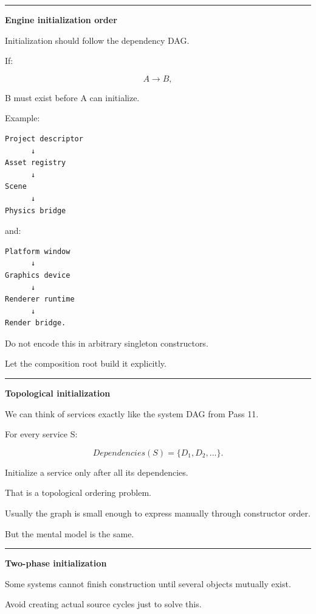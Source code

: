 \begin{center}\rule{0.5\linewidth}{0.5pt}\end{center}

\textbf{Engine initialization order}

Initialization should follow the dependency DAG.

If:

\[
A\rightarrow B,
\]

B must exist before A can initialize.

Example:

\begin{verbatim}
Project descriptor
      ↓
Asset registry
      ↓
Scene
      ↓
Physics bridge
\end{verbatim}

and:

\begin{verbatim}
Platform window
      ↓
Graphics device
      ↓
Renderer runtime
      ↓
Render bridge.
\end{verbatim}

Do not encode this in arbitrary singleton constructors.

Let the composition root build it explicitly.

\begin{center}\rule{0.5\linewidth}{0.5pt}\end{center}

\textbf{Topological initialization}

We can think of services exactly like the system DAG from Pass 11.

For every service S:

\[
Dependencies(S)=\{D_1,D_2,\dots\}.
\]

Initialize a service only after all its dependencies.

That is a topological ordering problem.

Usually the graph is small enough to express manually through constructor order.

But the mental model is the same.

\begin{center}\rule{0.5\linewidth}{0.5pt}\end{center}

\textbf{Two-phase initialization}

Some systems cannot finish construction until several objects mutually exist.

Avoid creating actual source cycles just to solve this.

